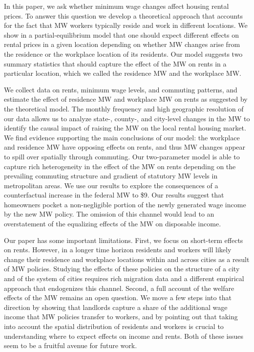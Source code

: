 
In this paper, we ask whether minimum wage changes affect housing rental prices.
To answer this question we develop a theoretical approach that accounts for
the fact that MW workers typically reside and work in different locations.
We show in a partial-equilibrium model that one should expect different effects
on rental prices in a given location depending on whether MW changes arise from 
the residence or the workplace location of its residents.
Our model suggests two summary statistics that should capture the effect of 
the MW on rents in a particular location, which we called the residence MW and 
the workplace MW.

We collect data on rents, minimum wage levels, and commuting patterns, and
estimate the effect of residence MW and workplace MW on rents as suggested by
the theoretical model.
The monthly frequency and high geographic resolution of our data allows us to 
analyze state-, county-, and city-level changes in the MW to identify the causal 
impact of raising the MW on the local rental housing market.
We find evidence supporting the main conclusions of our model: the workplace and 
residence MW have opposing effects on rents, and thus MW changes appear to 
spill over spatially through commuting.
Our two-parameter model is able to capture rich heterogeneity in the effect 
of the MW on rents depending on the prevailing commuting structure and 
gradient of statutory MW levels in metropolitan areas.
We use our results to explore the consequences of a counterfactual increase 
in the federal MW to \$9.
Our results suggest that homeowners pocket a non-negligible portion of the newly 
generated wage income by the new MW policy.
The omission of this channel would lead to an overstatement of the equalizing 
effects of the MW on disposable income.

Our paper has some important limitations.
First, we focus on short-term effects on rents.
However, in a longer time horizon residents and workers will likely change 
their residence and workplace locations within and across cities as a result 
of MW policies.
Studying the effects of these policies on the structure of a city and of the 
system of cities requires rich migration data and a different empirical approach
that endogenizes this channel.
Second, a full account of the welfare effects of the MW remains an open question.
We move a few steps into that direction by showing that landlords capture a 
share of the additional wage income that MW policies transfer to workers, and 
by pointing out that taking into account the spatial distribution of residents 
and workers is crucial to understanding where to expect effects on income and 
rents.
Both of these issues seem to be a fruitful avenue for future work.
